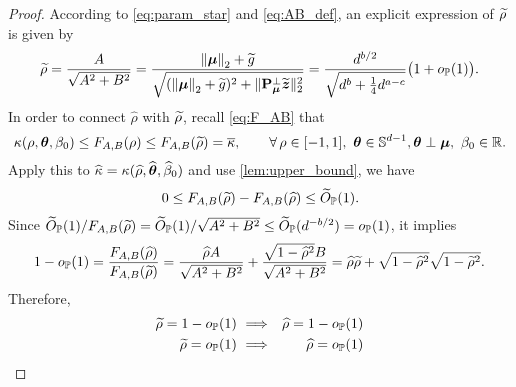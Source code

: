 \begin{proof}
According to \cref{eq:param_star} and \eqref{eq:AB_def}, an explicit expression of $\widetilde\rho$ is given by
\begin{equation}\label{eq:rho_star}
    \widetilde\rho = 
    \frac{A}{\sqrt{A^2 + B^2}}
    =
    \dfrac{ \left\|{{\boldsymbol{\mu}}}\right\|_2 + \widetilde g }{\sqrt{ ( \left\|{{\boldsymbol{\mu}}}\right\|_2 + \widetilde g )^2 + \| \mathrm{\bf P}_{{\boldsymbol{\mu}}}^\perp \widetilde{\text{\boldmath $z$}} \|_2^2 } }
    = \frac{d^{b/2}}{\sqrt{ d^{b} + \frac14 d^{a-c} }}  \bigl(1 + o_{\mathbb{P}}(1)\bigr).
\end{equation}
In order to connect $\hat\rho$ with $\widetilde\rho$, recall \cref{eq:F_AB} that
\begin{equation*}
    \kappa(\rho, {\boldsymbol{\theta}}, \beta_0) \le F_{A,B}(\rho) \le F_{A,B}(\widetilde\rho) = \overline\kappa,
    \qquad \forall\, \rho \in [-1, 1], \  {\boldsymbol{\theta}} \in \mathbb{S}^{d-1}, {\boldsymbol{\theta}} \perp {\boldsymbol{\mu}}, \  \beta_0 \in \mathbb{R}.
\end{equation*}
Apply this to $\widehat\kappa = \kappa(\widehat\rho, \widehat{{\boldsymbol{\theta}}}, \widehat\beta_0)$ and use \cref{lem:upper_bound}, we have
\begin{equation}\label{eq:F_AB_diff}
    0 \le F_{A,B}(\widetilde\rho) - F_{A,B}(\widehat\rho) \le \widetilde O_{\mathbb{P}}(1).
\end{equation}
Since $\widetilde O_{\mathbb{P}}(1)/F_{A,B}(\widetilde\rho) = \widetilde O_{\mathbb{P}}(1)/\sqrt{A^2 + B^2} \le \widetilde O_{\mathbb{P}}(d^{-b/2}) = o_{\mathbb{P}}(1)$, it implies
\begin{equation*}
    1 - o_{\mathbb{P}}(1)  =  \frac{F_{A,B}(\widehat\rho)}{F_{A,B}(\widetilde\rho)} 
    = \frac{\widehat\rho A }{\sqrt{A^2 + B^2}} + \frac{ \sqrt{1 - \widehat\rho^2} B}{\sqrt{A^2 + B^2}}
    = \widehat\rho \widetilde\rho + \sqrt{1 - \widehat\rho^2}\sqrt{1 - \widetilde\rho^2}.
\end{equation*}
Therefore,
\begin{equation}\label{eq:rho_star_to_hat}
    \begin{aligned}
        \widetilde\rho = 1 - o_{\mathbb{P}}(1) & \ \Longrightarrow & \widehat\rho = 1 - o_{\mathbb{P}}(1)
        \\
        \widetilde\rho = o_{\mathbb{P}}(1)     & \ \Longrightarrow & \widehat\rho = o_{\mathbb{P}}(1)
    \end{aligned}
\end{equation}


\end{proof}
